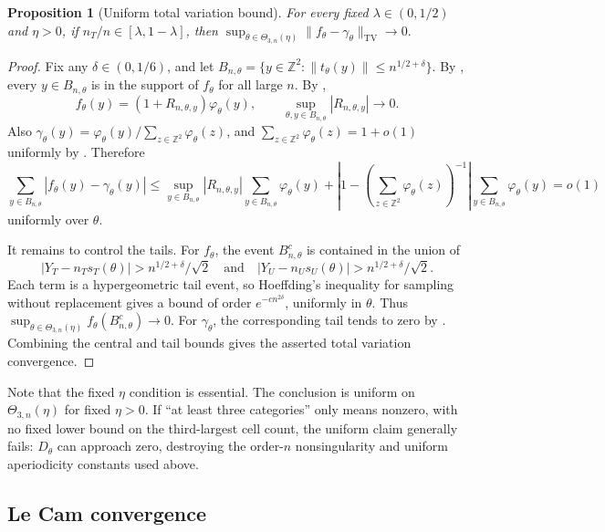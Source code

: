 \documentclass[12pt,reqno]{amsart}
\theoremstyle{theorem}
\newtheorem{prop}{Proposition}[section]
\theoremstyle{definition}
\newcommand{\0}{\mathbf{0}}
\newcommand{\1}{\mathbf{1}}
\begin{document}
\begin{prop}[Uniform total variation bound]\label{prop:tv}
For every fixed \(\lambda\in(0,1/2)\) and \(\eta>0\), if
\(n_T/n\in[\lambda,1-\lambda]\), then
\(
\sup_{\theta\in\Theta_{3,n}(\eta)}
\|f_\theta-\gamma_\theta\|_{\mathrm{TV}}
\to0.
\)
\end{prop}

\begin{proof}
Fix any \(\delta\in(0,1/6)\), and let
\(
B_{n,\theta}
=
\{y\in\mathbb Z^2:\|t_\theta(y)\|\le n^{1/2+\delta}\}.
\)
By , every \(y\in B_{n,\theta}\) is in the support of
\(f_\theta\) for all large \(n\).  By ,
\[
f_\theta(y)=(1+R_{n,\theta,y})\varphi_\theta(y),
\qquad
\sup_{\theta,y\in B_{n,\theta}}|R_{n,\theta,y}|\to0.
\]
Also \(\gamma_\theta(y)=\varphi_\theta(y)/\sum_{z\in\mathbb Z^2}\varphi_\theta(z)\),
and \(\sum_{z\in\mathbb Z^2}\varphi_\theta(z)=1+o(1)\) uniformly by
.  Therefore
\[
\sum_{y\in B_{n,\theta}}|f_\theta(y)-\gamma_\theta(y)|
\le
\sup_{y\in B_{n,\theta}}|R_{n,\theta,y}|
\sum_{y\in B_{n,\theta}}\varphi_\theta(y)
+
\left|1-\left(\sum_{z\in\mathbb Z^2}\varphi_\theta(z)\right)^{-1}\right|
\sum_{y\in B_{n,\theta}}\varphi_\theta(y)
=o(1)
\]
uniformly over \(\theta\).

It remains to control the tails.  For \(f_\theta\), the event
\(B_{n,\theta}^c\) is contained in the union of
\[
\left|Y_T-n_Ts_T(\theta)\right|>n^{1/2+\delta}/\sqrt2
\quad\text{and}\quad
\left|Y_U-n_Us_U(\theta)\right|>n^{1/2+\delta}/\sqrt2.
\]
Each term is a hypergeometric tail event, so Hoeffding's inequality for sampling
without replacement gives a bound of order \(e^{-c n^{2\delta}}\), uniformly in
\(\theta\).  Thus
\(
\sup_{\theta\in\Theta_{3,n}(\eta)}f_\theta(B_{n,\theta}^c)\to0.
\)
For \(\gamma_\theta\), the corresponding tail tends to zero by
.  Combining the central and tail bounds gives
the asserted total variation convergence.
\end{proof}

Note that the fixed \(\eta\) condition is essential.
The conclusion is uniform on \(\Theta_{3,n}(\eta)\) for fixed \(\eta>0\).  If
``at least three categories'' only means nonzero, with no fixed lower bound on
the third-largest cell count, the uniform claim generally fails: \(D_\theta\)
can approach zero, destroying the order-\(n\) nonsingularity and uniform
aperiodicity constants used above.

\subsection{Le Cam convergence}
\label{sec:lecamconv}
\end{document}
